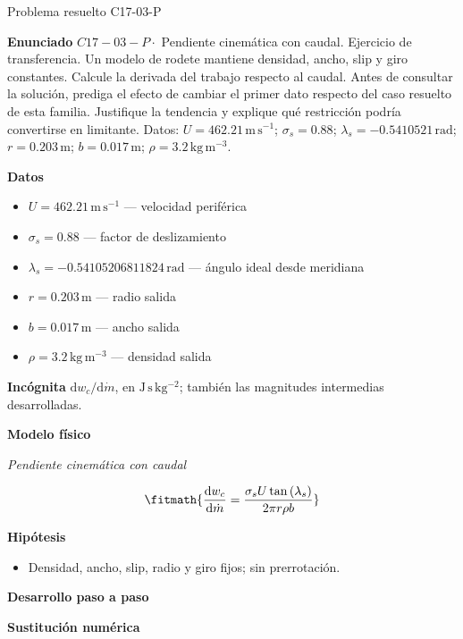 \documentclass[10pt,openany]{book}
\begin{document}
\begin{studiumworked}{Problema resuelto C17-03-P}


\noindent\textbf{Enunciado}
\(C17-03-P \cdot\) Pendiente cinemática con caudal. Ejercicio de transferencia. Un modelo de rodete mantiene densidad, ancho, slip y giro constantes. Calcule la derivada del trabajo respecto al caudal. Antes de consultar la solución, prediga el efecto de cambiar el primer dato respecto del caso resuelto de esta familia. Justifique la tendencia y explique qué restricción podría convertirse en limitante. Datos: \(U=462.21\, \mathrm{m}\,\mathrm{s}^{-1}\); \(\sigma_s=0.88\); \(\lambda_s=-0.5410521\, \mathrm{rad}\); \(r=0.203\, \mathrm{m}\); \(b=0.017\, \mathrm{m}\); \(\rho=3.2\, \mathrm{kg}\,\mathrm{m}^{-3}\).

\noindent\textbf{Datos}
\begin{itemize}
\item $U = 462.21\,\mathrm{m}\,\mathrm{s}^{-1}$ — velocidad periférica
\item $\sigma_s = 0.88$ — factor de deslizamiento
\item $\lambda_s = -0.54105206811824\,\mathrm{rad}$ — ángulo ideal desde meridiana
\item $r = 0.203\,\mathrm{m}$ — radio salida
\item $b = 0.017\,\mathrm{m}$ — ancho salida
\item $\rho = 3.2\,\mathrm{kg}\,\mathrm{m}^{-3}$ — densidad salida
\end{itemize}

\noindent\textbf{Incógnita}
$\mathrm{d}w_c/\mathrm{d}\dot{m}$, en $\mathrm{J\,s\,kg^{-2}}$; también las magnitudes intermedias desarrolladas.

\noindent\textbf{Modelo físico}

\noindent\textit{Pendiente cinemática con caudal}

\[
\fitmath{\frac{\mathrm{d}w_c}{\mathrm{d}\dot{m}}=\frac{\sigma_s U \tan{\left(\lambda_s \right)}}{2 \pi r \rho b}}
\]

\noindent\textbf{Hipótesis}
\begin{itemize}
\item Densidad, ancho, slip, radio y giro fijos; sin prerrotación.
\end{itemize}

\noindent\textbf{Desarrollo paso a paso}



\noindent\textbf{Sustitución numérica}


\end{studiumworked}
\end{document}
